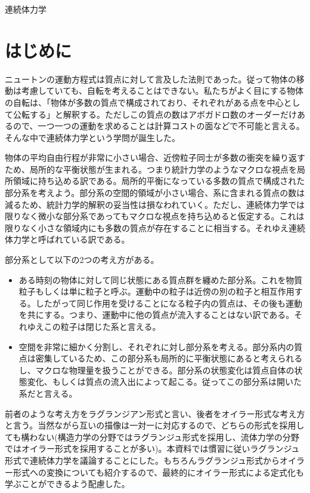 \documentclass[dvipdfmx, 9pt, a4paper]{jsarticle}
\numberwithin{equation}{section}
\begin{document}
\begin{center}
{\fontsize{18pt}{1pt}\selectfont 連続体力学}\\
\end{center}
\section*{はじめに}
ニュートンの運動方程式は質点に対して言及した法則であった。従って物体の移動は考慮していても、自転を考えることはできない。私たちがよく目にする物体の自転は、「物体が多数の質点で構成されており、それぞれがある点を中心として公転する」と解釈する。ただしこの質点の数はアボガドロ数のオーダーだけあるので、一つ一つの運動を求めることは計算コストの面などで不可能と言える。そんな中で連続体力学という学問が誕生した。\par
物体の平均自由行程が非常に小さい場合、近傍粒子同士が多数の衝突を繰り返すため、局所的な平衡状態が生まれる。つまり統計力学のようなマクロな視点を局所領域に持ち込める訳である。局所的平衡になっている多数の質点で構成された部分系を考えよう。部分系の空間的領域が小さい場合、系に含まれる質点の数は減るため、統計力学的解釈の妥当性は損なわれていく。ただし、連続体力学では限りなく微小な部分系であってもマクロな視点を持ち込めると仮定する。これは限りなく小さな領域内にも多数の質点が存在することに相当する。それゆえ連続体力学と呼ばれている訳である。\par
部分系として以下の2つの考え方がある。
\begin{itemize}
\item ある時刻の物体に対して同じ状態にある質点群を纏めた部分系。これを物質粒子もしくは単に粒子と呼ぶ。運動中の粒子は近傍の別の粒子と相互作用する。したがって同じ作用を受けることになる粒子内の質点は、その後も運動を共にする。つまり、運動中に他の質点が流入することはない訳である。それゆえこの粒子は閉じた系と言える。
\item 空間を非常に細かく分割し、それぞれに対し部分系を考える。部分系内の質点は密集しているため、この部分系も局所的に平衡状態にあると考えられるし、マクロな物理量を扱うことができる。部分系の状態変化は質点自体の状態変化、もしくは質点の流入出によって起こる。従ってこの部分系は開いた系だと言える。
\end{itemize}
前者のような考え方をラグランジアン形式と言い、後者をオイラー形式な考え方と言う。当然ながら互いの描像は一対一に対応するので、どちらの形式を採用しても構わない(構造力学の分野ではラグランジュ形式を採用し、流体力学の分野ではオイラー形式を採用することが多い)。本資料では慣習に従いラグランジュ形式で連続体力学を議論することにした。もちろんラグランジュ形式からオイラー形式への変換についても紹介するので、最終的にオイラー形式による定式化も学ぶことができるよう配慮した。\par
\end{document}

